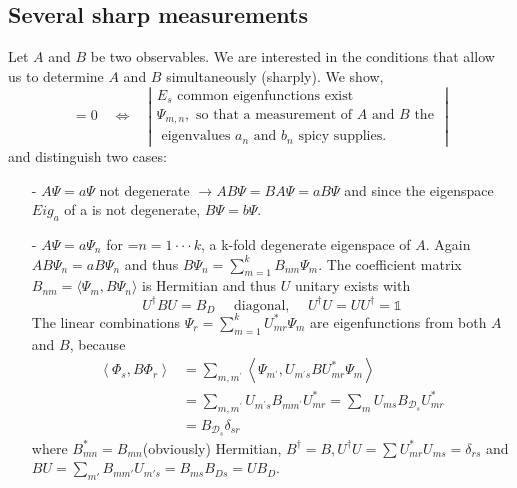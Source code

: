 \subsection{Several sharp measurements}
Let $A$ and $B$ be two observables. We are interested in the conditions that allow us to determine $A$ and $B$ simultaneously (sharply). We show,
\begin{equation}
[A, B]=0 \quad \Longleftrightarrow \quad | \begin{array}{l}{E_s\text { common eigenfunctions exist }} \\ {\Psi_{m, n}, \text { so that a measurement of } A \text { and } B \text { the }} \\ {\text { eigenvalues } a_{n} \text { and } b_{n} \text { spicy supplies. }}\end{array} |
\end{equation}
and distinguish two cases:
\begin{enumerate}
    \item[-] $A\Psi=a\Psi$ not degenerate $\to AB\Psi=BA\Psi=aB\Psi$ and since the eigenspace $Eig_a$ of a is not degenerate, $B\Psi=b\Psi$.
    \item[-] $A\Psi=a\Psi_n$ for =$n = 1 · · · k$, a k-fold degenerate eigenspace of $A$.
    Again $AB\Psi_n=aB\Psi_n$ and thus $B\Psi_n=\sum^k_{m=1}B_{nm}\Psi_{m}$. The coefficient matrix $B_{nm}=\langle \Psi_m,B\Psi_n\rangle$ is Hermitian and thus $U$ unitary exists with
    \begin{equation}
        U^{\dagger} B U=B_{D} \quad \text { diagonal, } \quad U^{\dagger} U=U U^{\dagger}=\mathbb{1}
        \end{equation}
    The linear combinations $\Psi_r=\sum^k_{m=1}U^*_{mr}\Psi_m$ are eigenfunctions
    from both $A$ and $B$, because
    \begin{equation}
    \begin{aligned}\left\langle\Phi_{s}, B \Phi_{r}\right\rangle &=\sum_{m, m^{\prime}}\left\langle\Psi_{m^{\prime}}, U_{m^{\prime} s} B U_{m r}^{*} \Psi_{m}\right\rangle \\ &=\sum_{m, m^{\prime}} U_{m^{\prime} s} B_{m m^{\prime}} U_{m r}^{*}=\sum_{m} U_{m s} B_{\mathcal{D}_{s}} U_{m r}^{*} \\ &=B_{\mathcal{D}_{s}} \delta_{s r} \end{aligned}
    \end{equation}
    where $B^*_{mn}=B_{mn}$(obviously) Hermitian, $B^{\dagger}=B, U^{\dagger}U=\sum U^*_{mr}U_{ms}=\delta_{rs}$ and $BU=\sum_{m'}B_{mm'}U_{m's}=B_{ms}B_{Ds}=UB_D$.
\end{enumerate}
